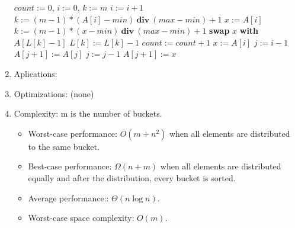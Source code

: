 \documentclass[12pt]{article}
\begin{document}
\begin{enumerate}
        \begin{algorithm}[H]
            \begin{algorithmic}[1]
                    \State $\textit{count}:=0$, $i:=0$, $k:=m$
                            \State $i:=i+1$
                            \State $k:=(m-1)*(A[i]-\textit{min})\ \textbf{div}\ (\textit{max}-\textit{min})+1$
                        \EndWhile
                        \State $x:=A[i]$
                            \State $k:=(m-1)*(x-\textit{min})\ \textbf{div}\ (\textit{max}-\textit{min})+1$
                            \State \textbf{swap} $x$ \textbf{with} $A[L[k]-1]$
                            \State $L[k]:=L[k]-1$
                            \State $\textit{count}:=\textit{count}+1$
                        \EndWhile
                    \EndWhile
                            \State $x:=A[i]$
                            \State $j:=i-1$
                                \State $A[j+1]:=A[j]$
                                \State $j:=j-1$
                            \EndWhile
                            \State $A[j+1]:=x$
                        \EndFor
                    \EndFor
                \EndFunction
            \end{algorithmic}
        \end{algorithm}
        \item Aplications:
        \item Optimizations: (none)
        \item Complexity: m is the number of buckets.
        \begin{itemize}
            \item Worst-case performance: $O(m+n^2)$ when all elements are distributed to the same bucket.
            \item Best-case performance: $\Omega(n+m)$ when all elements are distributed equally and after the distribution, every bucket is sorted.
            \item Average performance:: $\Theta(n\log n)$.
            \item Worst-case space complexity: $O(m)$.
        \end{itemize}
    \end{enumerate}
\end{document}
